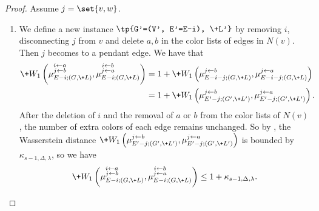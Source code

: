 \documentclass[a4paper,11pt]{article}
\newcommand{\pin}{\leftarrow}
\newcommand{\W}[1]{\+W_1\left(#1\right)}
\begin{document}
\begin{proof}
Assume $j=\set{v,w}$. 
    \begin{enumerate}
    \item We define a new instance $\tp{G'=(V', E'=E-i), \+L'}$ by removing $i$, disconnecting $j$ from $v$ and delete $a, b$ in the color lists of edges in $N(v)$. Then $j$ becomes to a pendant edge. We have that
    \begin{align*}
        \W{\mu_{E-i; (G, \+L)}^{\substack{i\pin a\\ j\pin b}}, \mu_{E-i;(G, \+L)}^{\substack{i\pin b\\ j\pin a}}}
        &= 1 + \W{\mu_{E-i-j; (G, \+L)}^{j\pin b}, \mu_{E-i-j; (G, \+L)}^{j\pin a}}\\
        &= 1 + \W{\mu_{E'-j;(G', \+L')}^{j\pin b}, \mu_{E'-j;(G', \+L')}^{j\pin a}}.
    \end{align*}
    After the deletion of $i$ and the removal of $a$ or $b$ from the color lists of $N(v)$, the number of extra colors of each edge remains unchanged. So by , the  Wasserstein distance
    $\W{\mu_{E'-j;(G', \+L')}^{j\pin b}, \mu_{E'-j;(G', \+L')}^{j\pin a}}$
    is bounded by $\kappa_{s-1, \Delta, \lambda}$, so we have
    \begin{align*}
    \W{\mu_{E-i; (G, \+L)}^{\substack{i\pin a\\ j\pin b}}, \mu_{E-i;(G, \+L)}^{\substack{i\pin b\\ j\pin a}}}
       \le 1+\kappa_{s-1, \Delta, \lambda}.
    \end{align*}


\end{enumerate}
\end{proof}
\end{document}
